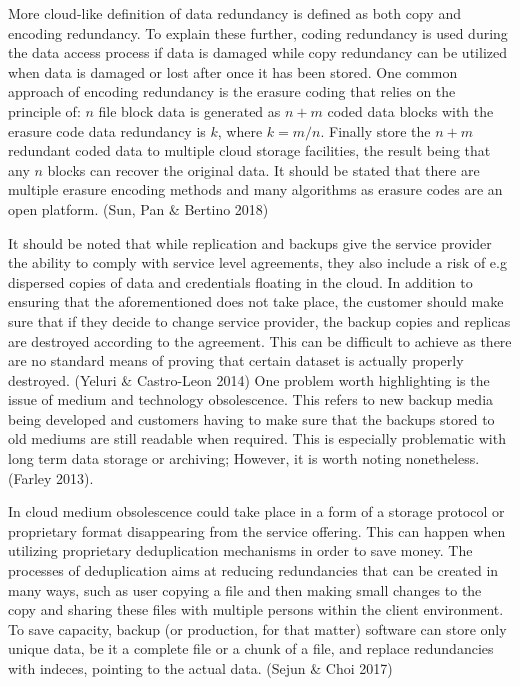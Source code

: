 \documentclass{article}
\begin{document}
\par
More cloud-like definition of data redundancy is defined as both copy and encoding redundancy. To explain these further, coding redundancy is used during the data access process if data is damaged while copy redundancy can be utilized when data is damaged or lost after once it has been stored. One common approach of encoding redundancy is the erasure coding that relies on the principle of: $n$ file block data is generated as $n + m$ coded data blocks with the erasure code data redundancy is $k$, where $k = m/n$. Finally store the $n + m$ redundant coded data to multiple cloud storage facilities, the result being that any $n$ blocks can recover the original data. It should be stated that there are multiple erasure encoding methods and many algorithms as erasure codes are an open platform. (Sun, Pan \& Bertino 2018)
\par
It should be noted that while replication and backups give the service provider the ability to comply with service level agreements, they also include a risk of e.g dispersed copies of data and credentials floating in the cloud. In addition to ensuring that the aforementioned does not take place, the customer should make sure that if they decide to change service provider, the backup copies and replicas are destroyed according to the agreement. This can be difficult to achieve as there are no standard means of proving that certain dataset is actually properly destroyed. (Yeluri \& Castro-Leon 2014)
One problem worth highlighting is the issue of medium and technology obsolescence. This refers to new backup media being developed and customers having to make sure that the backups stored to old mediums are still readable when required. This is especially problematic with long term data storage or archiving; However, it is worth noting nonetheless. (Farley 2013).
\par
In cloud medium obsolescence could take place in a form of a storage protocol or proprietary format disappearing from the service offering. This can happen when utilizing proprietary deduplication mechanisms in order to save money. The processes of deduplication aims at reducing redundancies that can be created in many ways, such as user copying a file and then making small changes to the copy and sharing these files with multiple persons within the client environment. To save capacity, backup (or production, for that matter) software can store only unique data, be it a complete file or a chunk of a file, and replace redundancies with indeces, pointing to the actual data. (Sejun \& Choi 2017)
\end{document}
